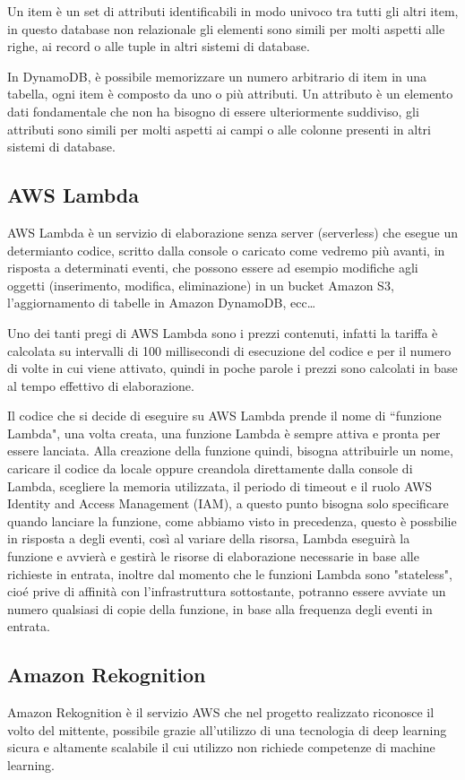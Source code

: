 Un item è un set di attributi identificabili in modo univoco tra tutti gli altri item, in questo database non relazionale gli elementi sono simili per molti aspetti 
alle righe, ai record o alle tuple in altri sistemi di database.

In DynamoDB, è possibile memorizzare un numero arbitrario di item in una tabella, ogni item è composto da uno o più attributi. Un attributo è un elemento dati 
fondamentale che non ha bisogno di essere ulteriormente suddiviso, gli attributi sono simili per molti aspetti ai campi o alle colonne presenti in altri sistemi 
di database.

\subsection{AWS Lambda}
AWS Lambda è un servizio di elaborazione senza server (serverless) che esegue un determianto codice, scritto dalla console o caricato come vedremo più avanti, in 
risposta a determinati eventi, che possono essere ad esempio modifiche agli oggetti (inserimento, modifica, eliminazione) in un bucket Amazon S3, l’aggiornamento di 
tabelle in Amazon DynamoDB, ecc\dots

Uno dei tanti pregi di AWS Lambda sono i prezzi contenuti, infatti la tariffa è calcolata su intervalli di 100 millisecondi di esecuzione del codice e per il numero di 
volte in cui viene attivato, quindi in poche parole i prezzi sono calcolati in base al tempo effettivo di elaborazione. 

Il codice che si decide di eseguire su AWS Lambda prende il nome di ``funzione Lambda", una volta creata, una funzione Lambda è sempre attiva e pronta per essere 
lanciata. Alla creazione della funzione quindi, bisogna attribuirle un nome, caricare il codice da locale oppure creandola direttamente dalla console di 
Lambda, scegliere la memoria utilizzata, il periodo di timeout e il ruolo AWS Identity and Access Management (IAM), a questo punto bisogna solo specificare quando 
lanciare la funzione, come abbiamo visto in precedenza, questo è possbilie in risposta a degli eventi, così al variare della risorsa, Lambda eseguirà la funzione e 
avvierà e gestirà le risorse di elaborazione necessarie in base alle richieste in entrata, inoltre dal momento che le funzioni Lambda sono "stateless", cioé prive di 
affinità con l'infrastruttura sottostante, potranno essere avviate un numero qualsiasi di copie della funzione, in base alla frequenza degli eventi in entrata.

\subsection{Amazon Rekognition}
Amazon Rekognition è il servizio AWS che nel progetto realizzato riconosce il volto del mittente, possibile grazie all'utilizzo di una tecnologia di deep learning 
sicura e altamente scalabile il cui utilizzo non richiede competenze di machine learning.

